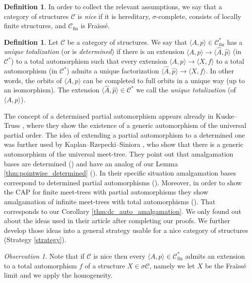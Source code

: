 \documentclass[oneside,notitlepage,12pt]{article}
\theoremstyle{definition}
\newtheorem{df}[tw]{Definition}
\theoremstyle{remark}
\newtheorem{observation}[tw]{Observation}
\newcommand \seq [1]{\langle #1 \rangle}
\newcommand \C {\mathscr{C}}
\newcommand \fin {{\operatorname{fin}}}
\begin{document}
\begin{df}\label{nice}
    In order to collect the relevant assumptions, we say that a category of structures $\C$ is \emph{nice} if it is hereditary, $\sigma$-complete, consists of locally finite structures, and $\C_\fin$ is Fraïssé.
\end{df}





\begin{df}
  Let $\C$ be a category of structures. 
    We say that $\seq{A, p} \in \C^*_\fin$ has a \emph{unique totalization} (or is \emph{determined}) if there is an extension $\seq{A, p} \to \seq{\hat{A}, \hat{p}}$ (in $\C^*$) to a total automorphism such that every extension $\seq{A, p} \to \seq{X, f}$ to a total automorphism (in $\C^*$) admits a unique factorization $\seq{\hat{A}, \hat{p}} \to \seq{X, f}$.
    In other words, the orbits of $\seq{A, p}$ can be completed to full orbits in a unique way (up to an isomorphism).
    The extension $\seq{\hat{A}, \hat{p}}\in \C^*$ we call the \emph{unique totalization} (of $\seq{A, p}$).
\end{df}

The concept of a determined partial automorphism appears already in Kuske--Truss \cite{KuTr}, where they show the existence of a generic automorphism of the universal partial order. The idea of extending a partial automorphism to a determined one was further used by Kaplan--Rzepecki--Siniora \cite{KaRzSi}, who show that there is a generic automorphism of the universal meet-tree. They point out that amalgamation bases are determined (\cite[Proposition 4.2]{KaRzSi}) and have an analog of our Lemma \ref{thm:pointwise_determined}  (\cite[Lemma 4.11]{KaRzSi}). In their specific situation amalgamation bases correspond to determined partial automorphisms (\cite[Corollary 4.19]{KaRzSi}).
Moreover, in order to show the CAP for finite meet-trees with partial automorphisms they show amalgamation of infinite meet-trees with total automorphisms (\cite[Lemma 4.16]{KaRzSi}). That corresponds to our Corollary \ref{thm:dc_auto_amalgamation}.
We only found out about the ideas used in their article after completing our proofs. We further develop those ideas into a general strategy usable for a nice category of structures (Strategy \ref{strategy}).



\begin{observation} \label{obs:totalization_exists}
Note that if $\C$ is nice then every $\seq{A, p} \in \C_\fin^*$ admits an extension to a total automorphism $f$ of a structure $X \in \sigma\C$, namely we let $X$ be the Fraïssé limit and we apply the homogeneity.
\end{observation}
\end{document}
